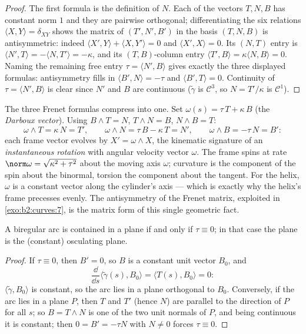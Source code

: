 \begin{proof}
The first formula is the definition of $N$. Each of the vectors
$T, N, B$ has constant norm $1$ and they are pairwise orthogonal;
differentiating the six relations $\langle X, Y\rangle = \delta_{XY}$
shows the matrix of $(T', N', B')$ in the basis $(T, N, B)$ is
antisymmetric: indeed $\langle X', Y\rangle + \langle X, Y'\rangle = 0$ and
$\langle X', X\rangle = 0$. Its $(N, T)$ entry is $\langle N', T\rangle =
-\langle N, T'\rangle = -\kappa$, and its $(T, B)$-column entry
$\langle T', B\rangle = \kappa\langle N, B\rangle = 0$. Naming the remaining
free entry $\tau = \langle N', B\rangle$ gives exactly the three displayed
formulas: antisymmetry fills in $\langle B', N\rangle = -\tau$ and
$\langle B', T\rangle = 0$. Continuity of $\tau = \langle N', B\rangle$ is clear
since $N'$ and $B$ are continuous ($\tilde\gamma$ is
$\mathcal{C}^3$, so $N = T'/\kappa$ is $\mathcal{C}^1$).
\end{proof}

\begin{example}\label{ex:b2:curves:darboux}
The three Frenet formulas compress into one. Set $\omega(s) =
\tau\,T + \kappa\,B$ (the \emph{Darboux vector}). Using $B
\wedge T = N$, $T \wedge N = B$, $N \wedge B = T$:
\[
\omega \wedge T = \kappa\,N = T', \qquad
\omega \wedge N = \tau\,B - \kappa\,T = N', \qquad
\omega \wedge B = -\tau\,N = B' :
\]
each frame vector evolves by $X' = \omega \wedge X$, the
kinematic signature of an \emph{instantaneous rotation} with
angular velocity vector $\omega$. The frame spins at rate
$\norm\omega = \sqrt{\kappa^2 + \tau^2}$ about the moving
axis $\omega$; curvature is the component of the spin about
the binormal, torsion the component about the tangent. For
the helix, $\omega$ is a constant vector along the cylinder's
axis --- which is exactly why the helix's frame precesses
evenly. The antisymmetry of the Frenet matrix, exploited in
\cref{exo:b2:curves:7}, is the matrix form of this single
geometric fact.
\end{example}

\begin{proposition}\label{prop:b2:curves:torsion}
A biregular arc is contained in a plane if and only if $\tau
\equiv 0$; in that case the plane is the (constant) osculating
plane.
\end{proposition}

\begin{proof}
If $\tau \equiv 0$, then $B' = 0$, so $B$ is a constant unit
vector $B_0$, and
\[
\frac{\dd}{\dd s}\langle \tilde\gamma(s), B_0\rangle
= \langle T(s), B_0\rangle = 0 :
\]
$\langle \tilde\gamma, B_0\rangle$ is constant, so the arc lies in a plane
orthogonal to $B_0$. Conversely, if the arc lies in a plane $P$,
then $T$ and $T'$ (hence $N$) are parallel to the direction of
$P$ for all $s$; so $B = T \wedge N$ is one of the two unit
normals of $P$, and being continuous it is constant; then $0 = B'
= -\tau N$ with $N \neq 0$ forces $\tau \equiv 0$.
\end{proof}

